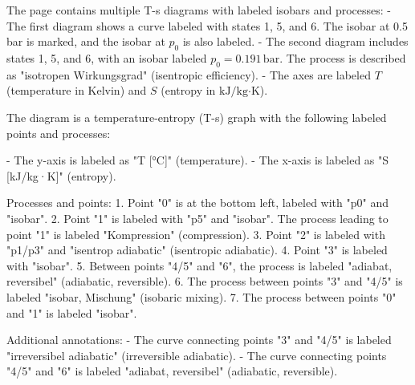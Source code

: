 The page contains multiple T-s diagrams with labeled isobars and processes:  
- The first diagram shows a curve labeled with states 1, 5, and 6. The isobar at 0.5 bar is marked, and the isobar at \( p_0 \) is also labeled.  
- The second diagram includes states 1, 5, and 6, with an isobar labeled \( p_0 = 0.191 \, \text{bar} \). The process is described as "isotropen Wirkungsgrad" (isentropic efficiency).  
- The axes are labeled \( T \) (temperature in Kelvin) and \( S \) (entropy in \( \text{kJ/kg·K} \)).

The diagram is a temperature-entropy (T-s) graph with the following labeled points and processes:  

- The y-axis is labeled as "T [°C]" (temperature).  
- The x-axis is labeled as "S [kJ/kg·K]" (entropy).  

Processes and points:  
1. Point "0" is at the bottom left, labeled with "p0" and "isobar".  
2. Point "1" is labeled with "p5" and "isobar". The process leading to point "1" is labeled "Kompression" (compression).  
3. Point "2" is labeled with "p1/p3" and "isentrop adiabatic" (isentropic adiabatic).  
4. Point "3" is labeled with "isobar".  
5. Between points "4/5" and "6", the process is labeled "adiabat, reversibel" (adiabatic, reversible).  
6. The process between points "3" and "4/5" is labeled "isobar, Mischung" (isobaric mixing).  
7. The process between points "0" and "1" is labeled "isobar".  

Additional annotations:  
- The curve connecting points "3" and "4/5" is labeled "irreversibel adiabatic" (irreversible adiabatic).  
- The curve connecting points "4/5" and "6" is labeled "adiabat, reversibel" (adiabatic, reversible).